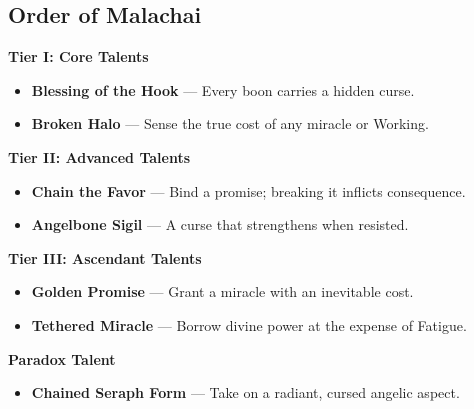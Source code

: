 \documentclass[11pt]{book}
\begin{document}
\subsection*{Order of Malachai}
\begin{tcolorbox}[colback=mistgray!10,colframe=bloodrust,title={Order of Malachai --- Talents}]

\textbf{Tier I: Core Talents}
\begin{itemize}[noitemsep]
  \item \textbf{Blessing of the Hook} --- Every boon carries a hidden curse.
  \item \textbf{Broken Halo} --- Sense the true cost of any miracle or Working.
\end{itemize}

\textbf{Tier II: Advanced Talents}
\begin{itemize}[noitemsep]
  \item \textbf{Chain the Favor} --- Bind a promise; breaking it inflicts consequence.
  \item \textbf{Angelbone Sigil} --- A curse that strengthens when resisted.
\end{itemize}

\textbf{Tier III: Ascendant Talents}
\begin{itemize}[noitemsep]
  \item \textbf{Golden Promise} --- Grant a miracle with an inevitable cost.
  \item \textbf{Tethered Miracle} --- Borrow divine power at the expense of Fatigue.
\end{itemize}

\textbf{Paradox Talent}
\begin{itemize}[noitemsep]
  \item \textbf{Chained Seraph Form} --- Take on a radiant, cursed angelic aspect.
\end{itemize}

\end{tcolorbox}
\end{document}
